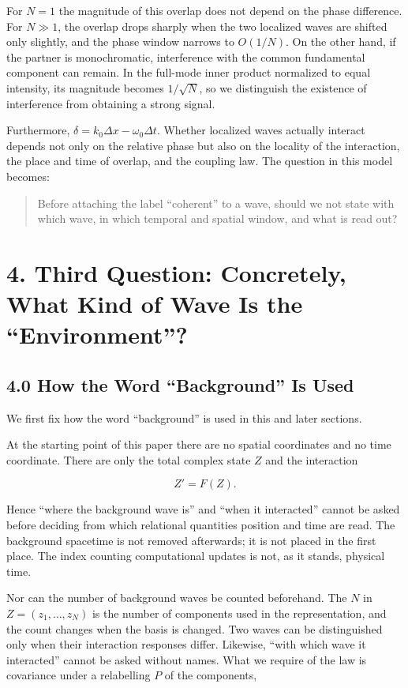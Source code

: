 \documentclass[
  a4paper,
]{article}
\begin{document}
For \(N=1\) the magnitude of this overlap does not depend on the phase
difference. For \(N\gg1\), the overlap drops sharply when the two
localized waves are shifted only slightly, and the phase window narrows
to \(O(1/N)\). On the other hand, if the partner is monochromatic,
interference with the common fundamental component can remain. In the
full-mode inner product normalized to equal intensity, its magnitude
becomes \(1/\sqrt N\), so we distinguish the existence of interference
from obtaining a strong signal.

Furthermore, \(\delta=k_0\Delta x-\omega_0\Delta t\). Whether localized
waves actually interact depends not only on the relative phase but also
on the locality of the interaction, the place and time of overlap, and
the coupling law. The question in this model becomes:

\begin{quote}
Before attaching the label ``coherent'' to a wave, should we not state
with which wave, in which temporal and spatial window, and what is read
out?
\end{quote}

\section{4. Third Question: Concretely, What Kind of Wave Is the
``Environment''?}\label{third-question-concretely-what-kind-of-wave-is-the-environment}

\subsection{4.0 How the Word ``Background'' Is
Used}\label{how-the-word-background-is-used}

We first fix how the word ``background'' is used in this and later
sections.

At the starting point of this paper there are no spatial coordinates and
no time coordinate. There are only the total complex state \(Z\) and the
interaction

\[
Z'=F(Z).
\]

Hence ``where the background wave is'' and ``when it interacted'' cannot
be asked before deciding from which relational quantities position and
time are read. The background spacetime is not removed afterwards; it is
not placed in the first place. The index counting computational updates
is not, as it stands, physical time.

Nor can the number of background waves be counted beforehand. The \(N\)
in \(Z=(z_1,\ldots,z_N)\) is the number of components used in the
representation, and the count changes when the basis is changed. Two
waves can be distinguished only when their interaction responses differ.
Likewise, ``with which wave it interacted'' cannot be asked without
names. What we require of the law is covariance under a relabelling
\(P\) of the components,
\end{document}

